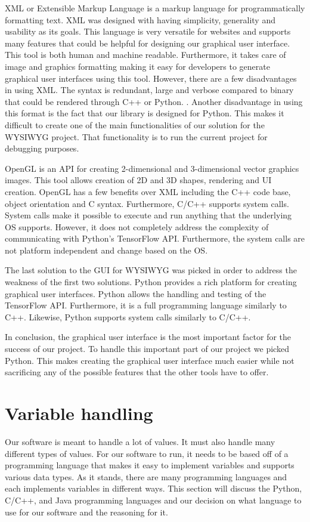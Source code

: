 \documentclass[journal,10pt,onecolumn,compsoc]{IEEEtran} \usepackage[margin=1.0in]{geometry} \usepackage{pdfpages} \usepackage{graphicx}
\begin{document}
\noindent XML or Extensible Markup Language is a markup language for programmatically formatting text. 
XML was designed with having simplicity, generality and usability as its goals. \cite{xmlf} 
This language is very versatile for websites and supports many features that could be helpful for designing our graphical user interface. 
This tool is both human and machine readable. 
Furthermore, it takes care of image and graphics formatting making it easy for developers to generate graphical user interfaces using this tool. 
However, there are a few disadvantages in using XML. 
The syntax is redundant, large and verbose compared to binary that could be rendered through C++ or Python. \cite{xmls}. 
Another disadvantage in using this format  is the fact that our library is designed for Python. 
This makes it difficult to create one of the main functionalities of our solution for the WYSIWYG project. 
That functionality is to run the current project for debugging purposes.

\noindent OpenGL is an API for creating 2-dimensional and 3-dimensional vector graphics images. \cite{opengl} 
This tool allows creation of 2D and 3D shapes, rendering and UI creation. 
OpenGL has a few benefits over XML including the C++ code base, object orientation and C syntax. \cite{oop}
Furthermore, C/C++ supports system calls. 
System calls make it possible to execute and run anything that the underlying OS supports. 
However, it does not completely address the complexity of communicating with Python's TensorFlow API. 
Furthermore, the system calls are not platform independent and change based on the OS.

\noindent The last solution to the GUI for WYSIWYG was picked in order to address the  weakness of the first two solutions. 
Python provides a rich platform for creating graphical user interfaces. 
Python allows the handling and testing of the TensorFlow API. 
Furthermore, it is a full programming language similarly to C++.
Likewise, Python supports system calls similarly to C/C++.

\noindent In conclusion, the graphical user interface is the most important factor for the success of our project. 
To handle this important part of our project we picked Python. This makes creating the graphical user interface much easier while not sacrificing any of the possible features that the other tools have to offer. 

\newpage

\section{Variable handling}
Our software is meant to handle a lot of values. 
It must also handle many different types of values. 
For our software to run, it needs to be based off of a programming language that makes it easy to implement variables and supports various data types. 
As it stands, there are many programming languages and each implements variables in different ways. 
This section will discuss the Python, C/C++, and Java programming languages and our decision on what language to use for our software and the reasoning for it.
\end{document}
